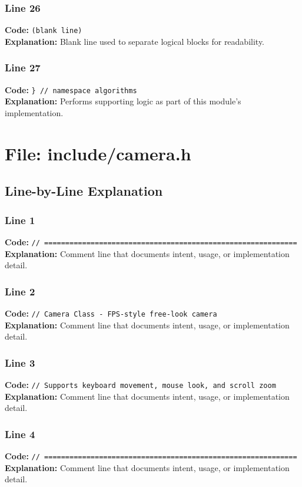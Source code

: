 \documentclass[11pt,a4paper]{article}
\begin{document}
\subsubsection*{Line 26}
\textbf{Code:} \texttt{(blank line)}\\
\textbf{Explanation:} Blank line used to separate logical blocks for readability.

\subsubsection*{Line 27}
\textbf{Code:} \verb|} // namespace algorithms|\\
\textbf{Explanation:} Performs supporting logic as part of this module's implementation.

\newpage
\section{File: include/camera.h}
\subsection{Line-by-Line Explanation}
\subsubsection*{Line 1}
\textbf{Code:} \verb|// ============================================================|\\
\textbf{Explanation:} Comment line that documents intent, usage, or implementation detail.

\subsubsection*{Line 2}
\textbf{Code:} \verb|// Camera Class - FPS-style free-look camera|\\
\textbf{Explanation:} Comment line that documents intent, usage, or implementation detail.

\subsubsection*{Line 3}
\textbf{Code:} \verb|// Supports keyboard movement, mouse look, and scroll zoom|\\
\textbf{Explanation:} Comment line that documents intent, usage, or implementation detail.

\subsubsection*{Line 4}
\textbf{Code:} \verb|// ============================================================|\\
\textbf{Explanation:} Comment line that documents intent, usage, or implementation detail.
\end{document}
